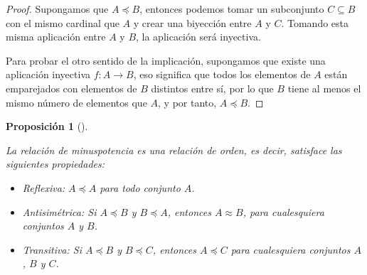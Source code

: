\documentclass[
  a4paper,
]{scrreport}
\providecommand{\tightlist}{%
  \setlength{\itemsep}{0pt}\setlength{\parskip}{0pt}}\usepackage{longtable,booktabs,array}
\theoremstyle{definition}
\theoremstyle{plain}
\theoremstyle{plain}
\theoremstyle{definition}
\theoremstyle{plain}
\newtheorem{proposition}{Proposición}[chapter]
\theoremstyle{remark}
\begin{document}
\begin{tcolorbox}[enhanced jigsaw, toptitle=1mm, rightrule=.15mm, colbacktitle=quarto-callout-note-color!10!white, bottomtitle=1mm, breakable, leftrule=.75mm, titlerule=0mm, coltitle=black, opacityback=0, colback=white, toprule=.15mm, title=\textcolor{quarto-callout-note-color}{\faInfo}\hspace{0.5em}{Demostración}, arc=.35mm, bottomrule=.15mm, colframe=quarto-callout-note-color-frame, left=2mm, opacitybacktitle=0.6]

\begin{proof}

Supongamos que \(A\preceq B\), entonces podemos tomar un subconjunto
\(C\subseteq B\) con el mismo cardinal que \(A\) y crear una biyección
entre \(A\) y \(C\). Tomando esta misma aplicación entre \(A\) y \(B\),
la aplicación será inyectiva.

Para probar el otro sentido de la implicación, supongamos que existe una
aplicación inyectiva \(f:A\longrightarrow B\), eso significa que todos
los elementos de \(A\) están emparejados con elementos de \(B\)
distintos entre sí, por lo que \(B\) tiene al menos el mismo número de
elementos que \(A\), y por tanto, \(A\preceq B\).

\end{proof}

\end{tcolorbox}

\begin{proposition}[]\protect\hypertarget{prp-minuspotencia-relacion-orden}{}\label{prp-minuspotencia-relacion-orden}

La relación de minuspotencia es una relación de orden, es decir,
satisface las siguientes propiedades:

\begin{itemize}
\tightlist
\item
  Reflexiva: \(A\preceq A\) para todo conjunto \(A\).
\item
  Antisimétrica: Si \(A\preceq B\) y \(B\preceq A\), entonces
  \(A\approx B\), para cualesquiera conjuntos \(A\) y \(B\).
\item
  Transitiva: Si \(A\preceq B\) y \(B\preceq C\), entonces
  \(A\preceq C\) para cualesquiera conjuntos \(A\), \(B\) y \(C\).
\end{itemize}

\end{proposition}
\end{document}
